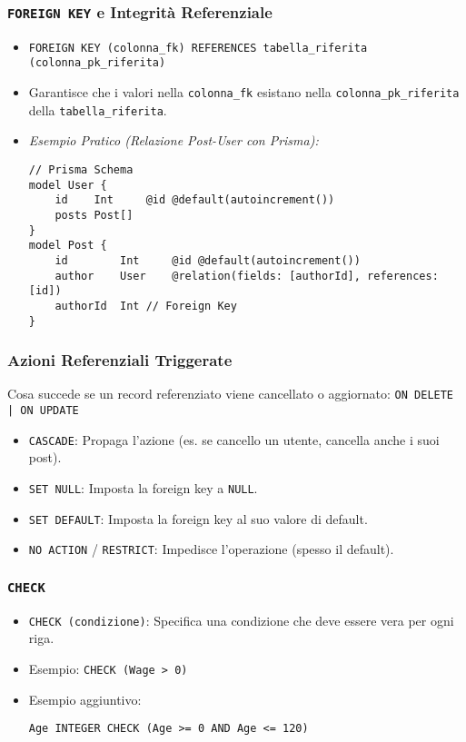 \subsubsection{\texttt{FOREIGN KEY} e Integrità Referenziale}
\begin{itemize}
	\item \texttt{FOREIGN KEY (colonna\_fk) REFERENCES tabella\_riferita (colonna\_pk\_riferita)}
	\item Garantisce che i valori nella \texttt{colonna\_fk} esistano nella \texttt{colonna\_pk\_riferita} della \texttt{tabella\_riferita}.
	\item \textit{Esempio Pratico (Relazione Post-User con Prisma):}
	\begin{verbatim}
// Prisma Schema
model User {
	id    Int     @id @default(autoincrement())
	posts Post[]
}
model Post {
	id        Int     @id @default(autoincrement())
	author    User    @relation(fields: [authorId], references: [id])
	authorId  Int // Foreign Key
}
	\end{verbatim}
\end{itemize}
\subsubsection{Azioni Referenziali Triggerate}
Cosa succede se un record referenziato viene cancellato o aggiornato: \texttt{ON DELETE | ON UPDATE}
\begin{itemize}
	\item \texttt{CASCADE}: Propaga l'azione (es. se cancello un utente, cancella anche i suoi post).
	\item \texttt{SET NULL}: Imposta la foreign key a \texttt{NULL}.
	\item \texttt{SET DEFAULT}: Imposta la foreign key al suo valore di default.
	\item \texttt{NO ACTION} / \texttt{RESTRICT}: Impedisce l'operazione (spesso il default).
\end{itemize}
\subsubsection{\texttt{CHECK}}
\begin{itemize}
	\item \texttt{CHECK (condizione)}: Specifica una condizione che deve essere vera per ogni riga.
	\item Esempio: \texttt{CHECK (Wage > 0)}
	\item Esempio aggiuntivo:
	\begin{verbatim}
Age INTEGER CHECK (Age >= 0 AND Age <= 120)
	\end{verbatim}
\end{itemize}


